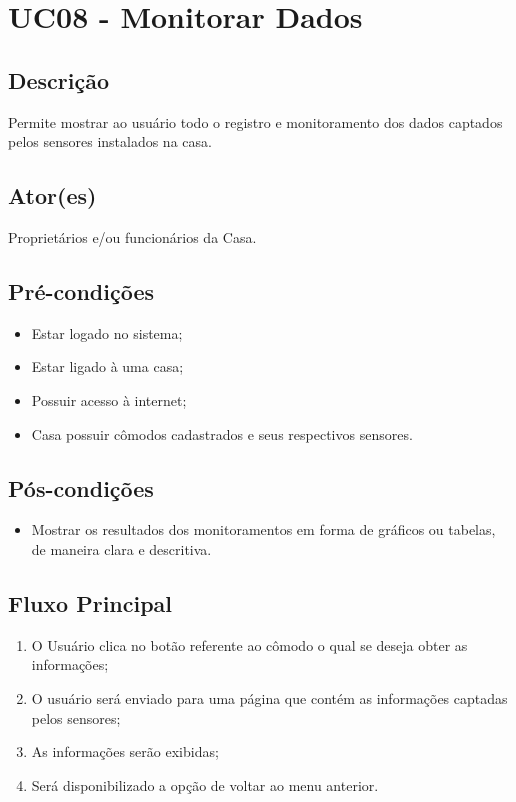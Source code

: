 \section{UC08 \-- Monitorar Dados}
    \subsection{Descrição}
        Permite mostrar ao usuário todo o registro e monitoramento dos dados captados pelos sensores instalados na casa.
    \subsection{Ator(es)}
        Proprietários e/ou funcionários da Casa.
    \subsection{Pré-condições}
        \begin{itemize}
            \item Estar logado no sistema;
            \item Estar ligado à uma casa;
            \item Possuir acesso à internet;
            \item Casa possuir cômodos cadastrados e seus respectivos sensores.
        \end{itemize}
    \subsection{Pós-condições}
        \begin{itemize}
            \item Mostrar os resultados dos monitoramentos em forma de gráficos ou tabelas, de maneira clara e descritiva.
        \end{itemize}
    \subsection{Fluxo Principal}
        \begin{enumerate}
            \item O Usuário clica no botão referente ao cômodo o qual se deseja obter as informações;
            \item O usuário será enviado para uma página que contém as informações captadas pelos sensores;
            \item As informações serão exibidas;
            \item Será disponibilizado a opção de voltar ao menu anterior.
        \end{enumerate}
